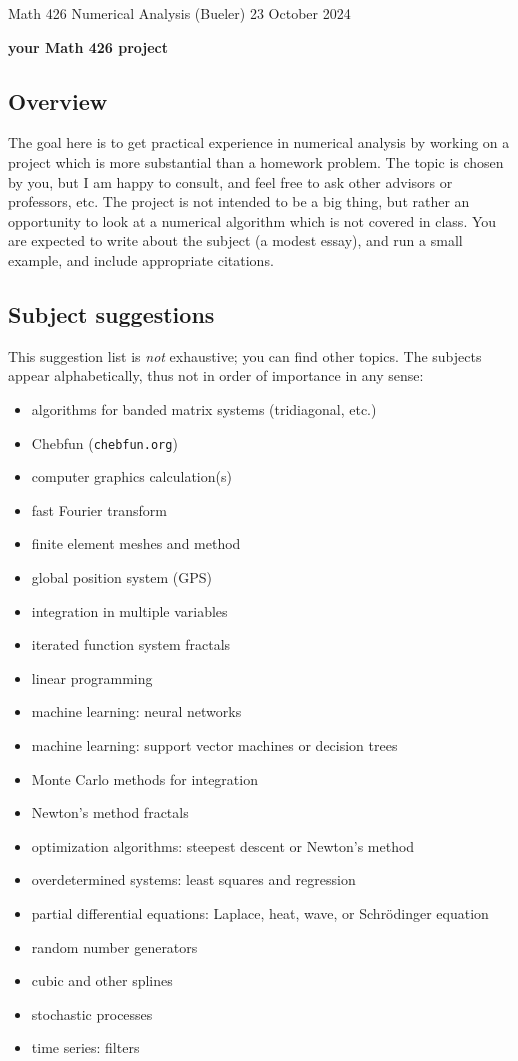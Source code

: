 \documentclass[11pt]{amsart}
\begin{document}
\scriptsize \noindent Math 426 Numerical Analysis (Bueler) \hfill 23 October 2024
\bigskip

\Large\centerline{\textbf{your Math 426 project}}
\normalsize

\thispagestyle{empty}

\bigskip

\subsection*{Overview}  The goal here is to get practical experience in numerical analysis by working on a project which is more substantial than a homework problem.  The topic is chosen by you, but I am happy to consult, and feel free to ask other advisors or professors, etc.  The project is not intended to be a big thing, but rather an opportunity to look at a numerical algorithm which is not covered in class.  You are expected to write about the subject (a modest essay), and run a small example, and include appropriate citations.

\subsection*{Subject suggestions}  This suggestion list is \emph{not} exhaustive; you can find other topics.  The subjects appear alphabetically, thus not in order of importance in any sense:
\begin{itemize}
\item algorithms for banded matrix systems (tridiagonal, etc.)
\item Chebfun (\texttt{chebfun.org})
\item computer graphics calculation(s)
\item fast Fourier transform
\item finite element meshes and method
\item global position system (GPS)
\item integration in multiple variables
\item iterated function system fractals
\item linear programming
\item machine learning: neural networks
\item machine learning: support vector machines or decision trees
\item Monte Carlo methods for integration
\item Newton's method fractals
\item optimization algorithms: steepest descent or Newton's method
\item overdetermined systems: least squares and regression
\item partial differential equations: Laplace, heat, wave, or Schr\"odinger equation
\item random number generators
\item cubic and other splines
\item stochastic processes
\item time series: filters
\end{itemize}
\end{document}
